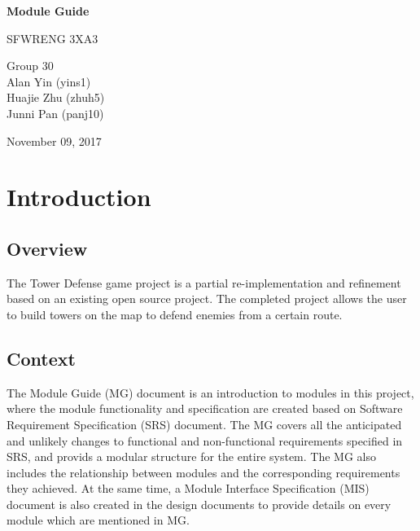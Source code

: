 \documentclass[12,english]{article}
\begin{document}
\begin{titlepage}
    \begin{center}
        \vspace*{1cm}
        
        \Huge
        \textbf{Module Guide}
        
        \vspace{0.5cm}
        \LARGE
        SFWRENG 3XA3
        
        \vspace{1.5cm}
        
\Large
        Group 30
		\\ Alan Yin (yins1)
		\\ Huajie Zhu (zhuh5)
		\\ Junni Pan (panj10)
        
        \vspace{1.5cm}
        
        \Large
        November 09, 2017
        
    \end{center}
\end{titlepage}

\newpage
\tableofcontents
\listoftables
\listoffigures
\newpage

\section{Introduction}
	\subsection{Overview}
	The Tower Defense game project is a partial re-implementation and refinement based on an existing open source project. The completed project allows the user to build towers on the map to defend enemies from a certain route.
	\subsection{Context}
	The Module Guide (MG) document is an introduction to modules in this project, where the module functionality and specification are created based on Software Requirement Specification (SRS) document. The MG covers all the anticipated and unlikely changes to functional and non-functional requirements specified in SRS, and provids a modular structure for the entire system. The MG also includes the relationship between modules and the corresponding requirements they achieved. At the same time, a Module Interface Specification (MIS) document is also created in the design documents to provide details on every module which are mentioned in MG. 
\end{document}
